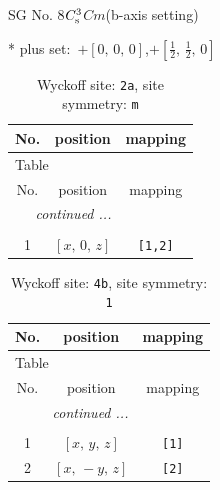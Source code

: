 \documentclass[fleqn,8pt]{jsarticle}
\begin{document}
\setcounter{MaxMatrixCols}{32}

\renewcommand{\tablename}{Table~}
\renewcommand{\figurename}{Figure~}
\begin{center}
\LARGE
SG No. 8\quad$C_{\rm s}^{3}$\quad$Cm$\quad(b-axis setting)\quad[ monoclinic ]
\end{center}
* plus set:\,\,\,$+\left[ 0,\, 0,\, 0 \right]$,\quad $+\left[ \frac{1}{2},\, \frac{1}{2},\, 0 \right]$
\renewcommand{\arraystretch}{1.2}
\begin{longtable}{ccc}
\caption{Wyckoff site: {\tt 2a}, site symmetry: {\tt m}}
 \\
 \hline \hline
No. & position & mapping \\ \hline \endfirsthead

\multicolumn{2}{l}{\tablename\ \thetable{}} \\
 \hline \hline
No. & position & mapping \\ \hline \endhead

 \hline \hline
\multicolumn{2}{r}{\footnotesize\it continued ...} \\ \endfoot

 \hline \hline
\multicolumn{2}{r}{} \\ \endlastfoot

1 & $\left[ x,\, 0,\, z \right]$ & {\tt [1,2]} \\
\end{longtable}
\renewcommand{\arraystretch}{1.2}
\begin{longtable}{ccc}
\caption{Wyckoff site: {\tt 4b}, site symmetry: {\tt 1}}
 \\
 \hline \hline
No. & position & mapping \\ \hline \endfirsthead

\multicolumn{2}{l}{\tablename\ \thetable{}} \\
 \hline \hline
No. & position & mapping \\ \hline \endhead

 \hline \hline
\multicolumn{2}{r}{\footnotesize\it continued ...} \\ \endfoot

 \hline \hline
\multicolumn{2}{r}{} \\ \endlastfoot

1 & $\left[ x,\, y,\, z \right]$ & {\tt [1]} \\ \hline
2 & $\left[ x,\, - y,\, z \right]$ & {\tt [2]} \\
\end{longtable}
\end{document}
